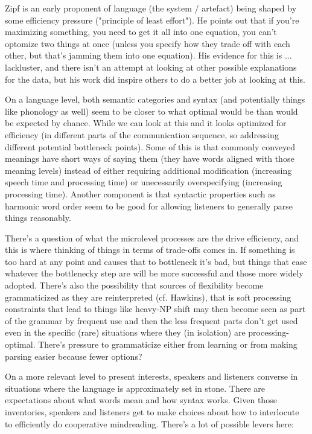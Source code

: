 \documentclass[]{article}
\begin{document}
Zipf is an early proponent of language (the system / artefact) being shaped by some efficiency pressure ("principle of least effort"). He points out that if you're maximizing something, you need to get it all into one equation, you can't optomize two things at once (unless you specify how they trade off with each other, but that's jamming them into one equation). His evidence for this is ... lackluster, and there isn't an attempt at looking at other possible explanations for the data, but his work did inspire others to do a better job at looking at this. 

On a language level, both semantic categories and syntax (and potentially things like phonology as well) seem to be closer to what optimal would be than would be expected by chance. While we can look at this and it looks optimized for efficiency (in different parts of the communication sequence, so addressing different potential bottleneck points). Some of this is that commonly conveyed meanings have short ways of saying them (they have words aligned with those meaning levels) instead of either requiring additional modification (increasing speech time and processing time) or unecessarily overspecifying (increasing processing time). Another component is that syntactic properties such as harmonic word order seem to be good for allowing listeners to generally parse things reasonably. 

There's a question of what the microlevel processes are the drive efficiency, and this is where thinking of things in terms of trade-offs comes in. If something is too hard at any point and causes that to bottleneck it's bad, but things that ease whatever the bottlenecky step are will be more successful and those more widely adopted. There's also the possibility that sources of flexibility become grammaticized as they are reinterpreted (cf. Hawkins), that is soft processing constraints that lead to things like heavy-NP shift may then become seen as part of the grammar by frequent use and then the less frequent parts don't get used even in the specific (rare) situations where they (in isolation) are processing-optimal. There's pressure to grammaticize either from learning or from making parsing easier because fewer options? 

On a more relevant level to present interests, speakers and listeners converse in situations where the language is approximately set in stone. There are expectations about what words mean and how syntax works. Given those inventories, speakers and listeners get to make choices about how to interlocute to efficiently do cooperative mindreading. There's a lot of possible levers here: 
\end{document}

